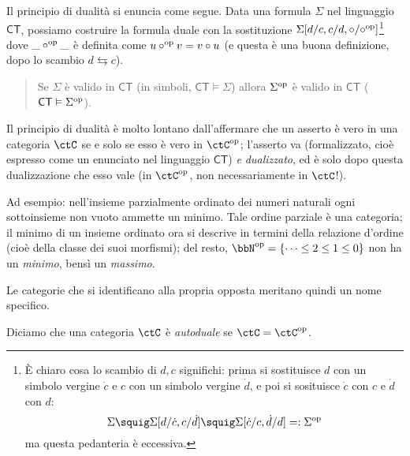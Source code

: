 \begin{proposition}
	Il principio di dualità si enuncia come segue.
	Data una formula \(\Sigma\) nel linguaggio \(\mathsf{CT}\), possiamo costruire la formula duale con la sostituzione \(\Sigma[d/c,c/d,\circ/\circ^{\text{op}}]\)\footnote{\`E chiaro cosa lo scambio di \(d,c\) significhi: prima si sostituisce \(d\) con un simbolo vergine \(\dot c\) e \(c\) con un simbolo vergine \(\dot d\), e poi si sosituisce \(\dot c\) con \(c\) e \(\dot d\) con \(d\):
		\[\Sigma \squig \Sigma[d/\dot c,c/\dot d]\squig \Sigma[\dot c/c,\dot d/d] =:\Sigma^\op\]
		ma questa pedanteria è eccessiva.} dove \(\_\circ^{\text{op}}\_\) è definita come \(u\circ^{\text{op}} v = v\circ u\) (e questa è una buona definizione, dopo lo scambio \(d\leftrightarrows c\)).
	\begin{quote}%
		Se \(\Sigma\) è valido in \(\mathsf{CT}\) (in simboli, \(\mathsf{CT}\vDash \Sigma\)) allora \(\Sigma^{\text{op}}\) è valido in \(\mathsf{CT}\) (\(\mathsf{CT}\vDash \Sigma^{\text{op}}\)).
	\end{quote}
\end{proposition}
\begin{remark}
	Il principio di dualità è molto lontano dall'affermare che un asserto è vero in una categoria \(\ctC\) se e solo se esso è vero in \(\ctC^\op\); l'asserto va (formalizzato, cioè espresso come un enunciato nel linguaggio \(\mathsf{CT}\)) \emph{e dualizzato}, ed è solo dopo questa dualizzazione che esso vale (in \(\ctC^\op\), non necessariamente in \(\ctC\)!).

	Ad esempio: nell'insieme parzialmente ordinato dei numeri naturali ogni sottoinsieme non vuoto ammette un minimo. Tale ordine parziale è una categoria; il minimo di un insieme ordinato ora si descrive in termini della relazione d'ordine (cioè della classe dei suoi morfismi); del resto, \(\bbN^\op = \{\dots\le 2 \le 1 \le 0\}\) non ha un \emph{minimo}, bensì un \emph{massimo}.
\end{remark}
Le categorie che si identificano alla propria opposta meritano quindi un nome specifico.
\begin{definition}
	Diciamo che una categoria \(\ctC\) è \emph{autoduale} se \(\ctC=\ctC^\op\).
\end{definition}
